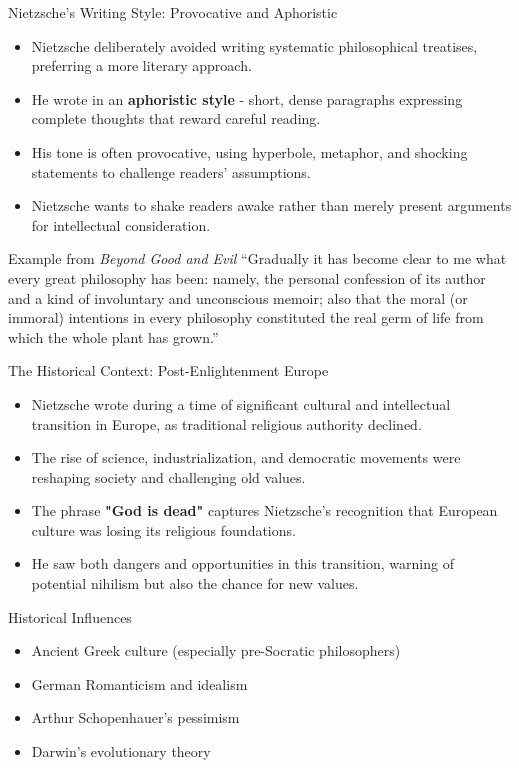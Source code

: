 \documentclass{beamer}
\begin{document}
\begin{frame}{Nietzsche's Writing Style: Provocative and Aphoristic}
\begin{itemize}
\item Nietzsche deliberately avoided writing systematic philosophical treatises, preferring a more literary approach.
\item He wrote in an \textbf{aphoristic style} - short, dense paragraphs expressing complete thoughts that reward careful reading.
\item His tone is often provocative, using hyperbole, metaphor, and shocking statements to challenge readers' assumptions.
\item Nietzsche wants to shake readers awake rather than merely present arguments for intellectual consideration.
\end{itemize}

\begin{exampleblock}{Example from \textit{Beyond Good and Evil}}
``Gradually it has become clear to me what every great philosophy has been: namely, the personal confession of its author and a kind of involuntary and unconscious memoir; also that the moral (or immoral) intentions in every philosophy constituted the real germ of life from which the whole plant has grown.''
\end{exampleblock}
\end{frame}


\begin{frame}{The Historical Context: Post-Enlightenment Europe}
\begin{itemize}
\item Nietzsche wrote during a time of significant cultural and intellectual transition in Europe, as traditional religious authority declined.
\item The rise of science, industrialization, and democratic movements were reshaping society and challenging old values.
\item The phrase \textbf{"God is dead"} captures Nietzsche's recognition that European culture was losing its religious foundations.
\item He saw both dangers and opportunities in this transition, warning of potential nihilism but also the chance for new values.
\end{itemize}

\begin{block}{Historical Influences}
\begin{itemize}
\item Ancient Greek culture (especially pre-Socratic philosophers)
\item German Romanticism and idealism
\item Arthur Schopenhauer's pessimism
\item Darwin's evolutionary theory
\end{itemize}
\end{block}
\end{frame}
\end{document}
